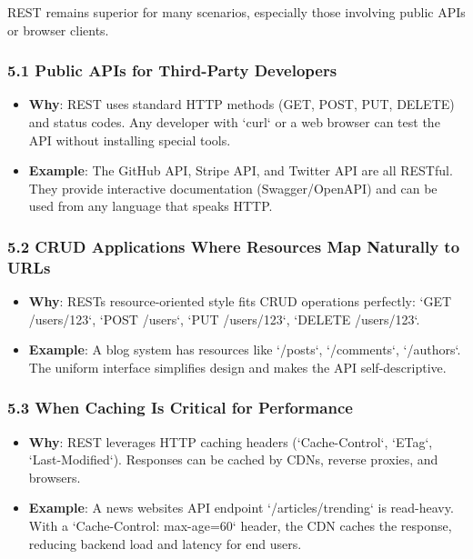\documentclass[a4paper]{article}
\begin{document}
REST remains superior for many scenarios, especially those involving public APIs or browser clients.

\subsubsection{5.1 Public APIs for Third-Party Developers}
\begin{itemize}
    \item \textbf{Why}: REST uses standard HTTP methods (GET, POST, PUT, DELETE) and status codes. Any developer with `curl` or a web browser can test the API without installing special tools.
    \item \textbf{Example}: The GitHub API, Stripe API, and Twitter API are all RESTful. They provide interactive documentation (Swagger/OpenAPI) and can be used from any language that speaks HTTP.
\end{itemize}

\subsubsection{5.2 CRUD Applications Where Resources Map Naturally to URLs}
\begin{itemize}
    \item \textbf{Why}: RESTs resource-oriented style fits CRUD operations perfectly: `GET /users/123`, `POST /users`, `PUT /users/123`, `DELETE /users/123`.
    \item \textbf{Example}: A blog system has resources like `/posts`, `/comments`, `/authors`. The uniform interface simplifies design and makes the API self-descriptive.
\end{itemize}

\subsubsection{5.3 When Caching Is Critical for Performance}
\begin{itemize}
    \item \textbf{Why}: REST leverages HTTP caching headers (`Cache-Control`, `ETag`, `Last-Modified`). Responses can be cached by CDNs, reverse proxies, and browsers.
    \item \textbf{Example}: A news websites API endpoint `/articles/trending` is read-heavy. With a `Cache-Control: max-age=60` header, the CDN caches the response, reducing backend load and latency for end users.
\end{itemize}
\end{document}
